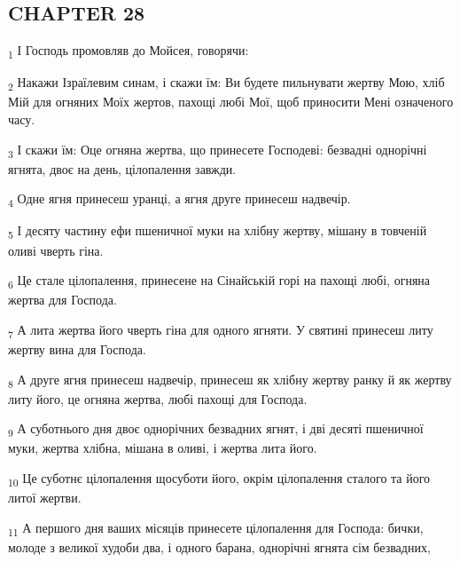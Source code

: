 \subsection{CHAPTER 28}
\begin{tcolorbox}
\textsubscript{1} І Господь промовляв до Мойсея, говорячи:
\end{tcolorbox}
\begin{tcolorbox}
\textsubscript{2} Накажи Ізраїлевим синам, і скажи їм: Ви будете пильнувати жертву Мою, хліб Мій для огняних Моїх жертов, пахощі любі Мої, щоб приносити Мені означеного часу.
\end{tcolorbox}
\begin{tcolorbox}
\textsubscript{3} І скажи їм: Оце огняна жертва, що принесете Господеві: безвадні однорічні ягнята, двоє на день, цілопалення завжди.
\end{tcolorbox}
\begin{tcolorbox}
\textsubscript{4} Одне ягня принесеш уранці, а ягня друге принесеш надвечір.
\end{tcolorbox}
\begin{tcolorbox}
\textsubscript{5} І десяту частину ефи пшеничної муки на хлібну жертву, мішану в товченій оливі чверть гіна.
\end{tcolorbox}
\begin{tcolorbox}
\textsubscript{6} Це стале цілопалення, принесене на Сінайській горі на пахощі любі, огняна жертва для Господа.
\end{tcolorbox}
\begin{tcolorbox}
\textsubscript{7} А лита жертва його чверть гіна для одного ягняти. У святині принесеш литу жертву вина для Господа.
\end{tcolorbox}
\begin{tcolorbox}
\textsubscript{8} А друге ягня принесеш надвечір, принесеш як хлібну жертву ранку й як жертву литу його, це огняна жертва, любі пахощі для Господа.
\end{tcolorbox}
\begin{tcolorbox}
\textsubscript{9} А суботнього дня двоє однорічних безвадних ягнят, і дві десяті пшеничної муки, жертва хлібна, мішана в оливі, і жертва лита його.
\end{tcolorbox}
\begin{tcolorbox}
\textsubscript{10} Це суботнє цілопалення щосуботи його, окрім цілопалення сталого та його литої жертви.
\end{tcolorbox}
\begin{tcolorbox}
\textsubscript{11} А першого дня ваших місяців принесете цілопалення для Господа: бички, молоде з великої худоби два, і одного барана, однорічні ягнята сім безвадних,
\end{tcolorbox}
